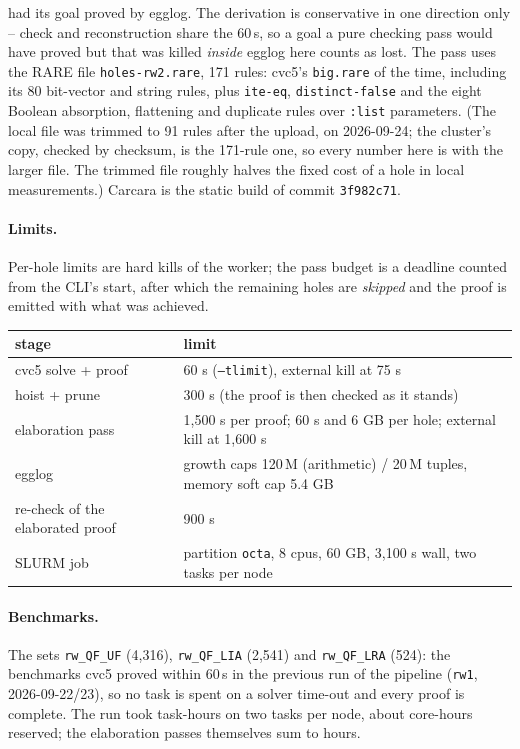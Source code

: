 \documentclass[11pt,a4paper]{article}
\newcommand{\code}[1]{\texttt{#1}}
\begin{document}
had its goal proved by egglog. The derivation is conservative in one
direction only -- check and reconstruction share the 60\,s, so a goal a
pure checking pass would have proved but that was killed \emph{inside}
egglog here counts as lost. The pass uses the RARE file
\code{holes-rw2.rare}, 171 rules: cvc5's \code{big.rare} of the time,
including its 80 bit-vector and string rules, plus \code{ite-eq},
\code{distinct-false} and the eight Boolean absorption, flattening and
duplicate rules over \code{:list} parameters. (The local file was trimmed
to 91 rules after the upload, on 2026-09-24; the cluster's copy, checked
by checksum, is the 171-rule one, so every number here is with the
larger file. The trimmed file roughly halves the fixed cost of a hole in
local measurements.) Carcara is the static build of commit
\code{3f982c71}.

\paragraph{Limits.} Per-hole limits are hard kills of the worker; the
pass budget is a deadline counted from the CLI's start, after which the
remaining holes are \emph{skipped} and the proof is emitted with what was
achieved.
\begin{center}\small
\begin{tabular}{ll}
\toprule
stage & limit \\
\midrule
cvc5 solve + proof & 60 s (\code{--tlimit}), external kill at 75 s \\
hoist + prune & 300 s (the proof is then checked as it stands) \\
elaboration pass & 1,500 s per proof; 60 s and 6 GB per hole; external kill at 1,600 s \\
\quad egglog & growth caps 120\,M (arithmetic) / 20\,M tuples, memory soft cap 5.4 GB \\
re-check of the elaborated proof & 900 s \\
SLURM job & partition \code{octa}, 8 cpus, 60 GB, 3,100 s wall, two tasks per node \\
\bottomrule
\end{tabular}
\end{center}

\paragraph{Benchmarks.} The sets \code{rw\_QF\_UF} (4,316), \code{rw\_QF\_LIA}
(2,541) and \code{rw\_QF\_LRA} (524): the benchmarks cvc5 proved within 60\,s
in the previous run of the pipeline (\code{rw1}, 2026-09-22/23), so no task
is spent on a solver time-out and every proof is complete. The run took
\wallhours{} task-hours on two tasks per node, about \cpuhours{} core-hours
reserved; the elaboration passes themselves sum to \passhours{} hours.
\end{document}
